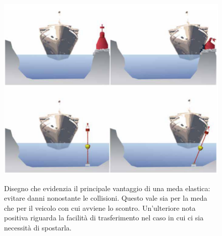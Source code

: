 \documentclass[./main.tex]{subfiles}
\begin{document}
\begin{figure}[!ht]
\noindent\begin{minipage}{0.5\textwidth}
\vspace{1cm}
\includegraphics[width=\textwidth]{images/boa_vs_medaelastica.pdf}
\captionsetup{font=small, hypcap=false}
\label{fig:boa_vs_medaelastica}
\end{minipage}
\hspace{0.05\textwidth}
\begin{minipage}{0.4\textwidth}
\begin{small}
Disegno che evidenzia il principale vantaggio di una meda elastica: evitare danni nonostante le collisioni. Questo vale sia per la meda che per il veicolo con cui avviene lo scontro. Un'ulteriore nota positiva riguarda la facilità di trasferimento nel caso in cui ci sia necessità di spostarla.
\end{small}
\end{minipage}
\vspace{0.25cm}
\end{figure} 
\end{document}
